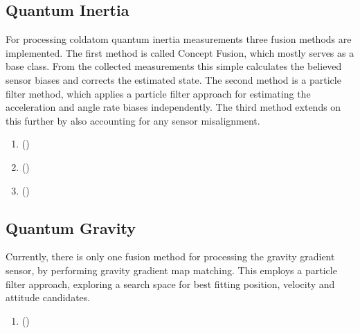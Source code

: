 \documentclass[letterpaper,10pt,english]{sphinxmanual}
\begin{document}
\subsection{Quantum Inertia}
\label{\detokenize{usage/fusion:quantum-inertia}}
\sphinxAtStartPar
For processing cold\sphinxhyphen{}atom quantum inertia measurements three fusion methods are implemented. The first method is
called Concept Fusion, which mostly serves as a base class. From the collected measurements this simple calculates
the believed sensor biases and corrects the estimated state. The second method is a particle filter method, which
applies a particle filter approach for estimating the acceleration and angle rate biases independently. The third
method extends on this further by also accounting for any sensor misalignment.
\begin{enumerate}
%
\item {} 
\sphinxAtStartPar
{\hyperref[\detokenize{modules/quantum/base:base-py}]{}} ()

\item {} 
\sphinxAtStartPar
{\hyperref[\detokenize{modules/quantum/realistic:realistic-py}]{}} ()

\item {} 
\sphinxAtStartPar
{\hyperref[\detokenize{modules/quantum/realistic:realistic-py}]{}} ()

\end{enumerate}


\subsection{Quantum Gravity}
\label{\detokenize{usage/fusion:quantum-gravity}}
\sphinxAtStartPar
Currently, there is only one fusion method for processing the gravity gradient sensor, by performing gravity
gradient map matching. This employs a particle filter approach, exploring a search space for best fitting
position, velocity and attitude candidates.
\begin{enumerate}
%
\item {} 
\sphinxAtStartPar
{\hyperref[\detokenize{modules/quantum/gravity_gradient:gravity-gradient-py}]{}} ()

\end{enumerate}
\end{document}

